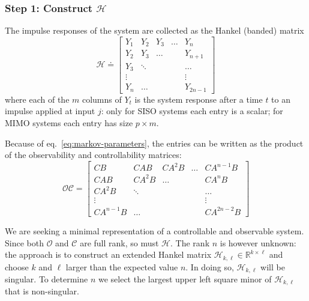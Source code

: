\subsubsection{Step 1: Construct $\mathcal{H}$}
\label{sec:construct-Hankel}

The impulse responses of the system are collected as the Hankel (banded) matrix
\begin{equation}
  \label{eq:hankel-matrix-from-impulse-response}
  \mathcal{H} \doteq
  \begin{bmatrix}
    Y_1 & Y_2 & Y_3 & \ldots & Y_n \\
    Y_2 & Y_3 & \ldots & & Y_{n+1} \\
    Y_3 & \ddots & & & \ldots \\
    \vdots & & & & \vdots \\
    Y_n & \ldots & & & Y_{2n-1}
  \end{bmatrix}
\end{equation}
where each of the $m$ columns of $Y_t$ is the system response after a time $t$ to an impulse applied at input $j$: only for SISO systems each entry is a scalar; for MIMO systems each entry has size $p\times m$.

Because of eq.~\eqref{eq:markov-parameters}, the entries can be written as the product of the observability and controllability matrices:
\begin{equation}
  \mathcal{O}\mathcal{C} =
  \begin{bmatrix}
    CB & CAB & CA^2 B & \ldots & CA^{n-1}B \\
    CAB & CA^2B & \ldots & & CA^nB \\
    CA^2B & \ddots & & & \ldots \\
    \vdots & & & & \vdots \\
    CA^{n-1}B & \ldots & & & CA^{2n-2}B
  \end{bmatrix}
\end{equation}

We are seeking a minimal representation of a controllable and observable system. Since both $\mathcal{O}$ and $\mathcal{C}$ are full rank, so must $\mathcal{H}$. The rank $n$ is however unknown: the approach is to construct an extended Hankel matrix $\mathcal{H}_{k,\ell}\in \mathbb{R}^{k\times \ell}$ and choose $k$ and $\ell$ larger than the expected value $n$. In doing so, $\mathcal{H}_{k,\ell}$ will be singular. To determine $n$ we select the largest upper left square minor of $\mathcal{H}_{k,\ell}$ that is non-singular.

